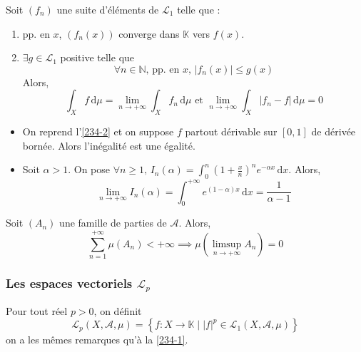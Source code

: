   \begin{theorem}
    Soit $(f_n)$ une suite d'éléments de $\mathcal{L}_1$ telle que :
    \begin{enumerate}[label={\bfseries(\roman*)}]
      \item pp. en $x$, $(f_n(x))$ converge dans $\mathbb{K}$ vers $f(x)$.
      \item $\exists g \in \mathcal{L}_1$ positive telle que
      \[ \forall n \in \mathbb{N}, \, \text{pp. en } x, \, \vert f_n(x) \vert \leq g(x) \]
      Alors,
      \[ \int_X f \, \mathrm{d}\mu = \lim_{n \rightarrow +\infty} \int_X f_n \, \mathrm{d}\mu \text{ et } \lim_{n \rightarrow +\infty} \int_X \vert f_n - f \vert \, \mathrm{d}\mu = 0 \]
    \end{enumerate}
  \end{theorem}

  \begin{example}
    \begin{itemize}
      \item On reprend l'\cref{234-2} et on suppose $f$ partout dérivable sur $[0,1]$ de dérivée bornée. Alors l'inégalité est une égalité.
      \item Soit $\alpha > 1$. On pose $\forall n \geq 1, \, I_n(\alpha) = \int_0^n \left( 1 + \frac{x}{n} \right)^n e^{-\alpha x} \, \mathrm{d}x$. Alors,
      \[ \lim_{n \rightarrow +\infty} I_n(\alpha) = \int_0^{+\infty} e^{(1-\alpha)x} \, \mathrm{d}x = \frac{1}{\alpha - 1} \]
    \end{itemize}
  \end{example}

  \begin{application}
    Soit $(A_n)$ une famille de parties de $\mathcal{A}$. Alors,
    \[ \sum_{n=1}^{+\infty} \mu(A_n) < +\infty \implies \mu \left( \limsup_{n \rightarrow +\infty} A_n \right) = 0 \]
  \end{application}

  \subsubsection{Les espaces vectoriels \texorpdfstring{$\mathcal{L}_p$}{Lₚ}}


  \begin{definition}
    Pour tout réel $p > 0$, on définit
    \[ \mathcal{L}_p(X, \mathcal{A}, \mu) = \left\{ f : X \rightarrow \mathbb{K} \mid |f|^p \in \mathcal{L}_1(X, \mathcal{A}, \mu) \right\} \]
    on a les mêmes remarques qu'à la \cref{234-1}.
  \end{definition}

